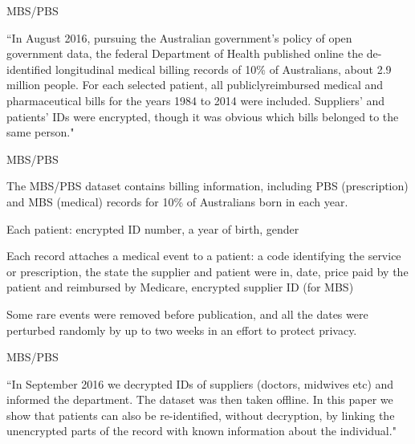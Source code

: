 \documentclass[12pt,aspectratio=169,handout]{beamer}
\begin{document}
\begin{frame}{MBS/PBS}

``In August 2016, pursuing the Australian government’s policy of open government data, the federal Department of Health published online the de-identified longitudinal medical billing records of 10\% of Australians, about 2.9 million people. For each selected patient, all publiclyreimbursed medical and pharmaceutical bills for the years 1984 to 2014 were included. Suppliers' and patients' IDs were encrypted, though it was obvious which bills belonged to the same person." \citep[p.~1]{Culnane.et.al.2017.arXiv}



\end{frame}


\begin{frame}{MBS/PBS}

The MBS/PBS dataset contains billing information, including PBS (prescription) and MBS (medical) records for 10\% of Australians born in each year.

Each patient: encrypted ID number, a year of birth, gender

Each record attaches a medical event to a patient: a code identifying the service or prescription, the state the supplier and patient were in, date, price paid by the patient and reimbursed by Medicare, encrypted supplier ID (for MBS)

Some rare events were removed before publication, and all the dates were perturbed randomly by up to two weeks in an effort to protect privacy.


\end{frame}



\begin{frame}{MBS/PBS}

``In September 2016 we decrypted IDs of suppliers (doctors, midwives etc) and informed the department. The dataset was then taken offline. In this paper we show that patients can also be re-identified, without decryption, by linking the unencrypted parts of the record with known information about the individual." \citep{Culnane.et.al.2017.arXiv}


\end{frame}
\end{document}

